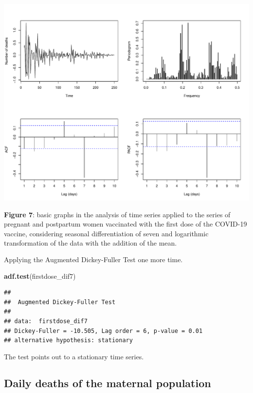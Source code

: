 \documentclass[
]{article}
\newenvironment{Shaded}{\begin{snugshade}}{\end{snugshade}}
\newcommand{\FunctionTok}[1]{\textcolor[rgb]{0.13,0.29,0.53}{\textbf{#1}}}
\newcommand{\NormalTok}[1]{#1}
\renewenvironment{Shaded}{\begin{mdframed}[ backgroundcolor=shadecolor, linecolor = shadecolor, leftmargin=\dimexpr\leftmargin-2pt\relax, innerleftmargin=1.6pt, innertopmargin=5pt, skipabove=10pt,skipbelow=3pt ]}{\end{mdframed}}
\begin{document}
\begin{center}\includegraphics[width=\linewidth]{IF_results_ENG_files/figure-latex/unnamed-chunk-8-1} \end{center}

\textbf{Figure 7}: basic graphs in the analysis of time series applied
to the series of pregnant and postpartum women vaccinated with the first
dose of the COVID-19 vaccine, considering seasonal differentiation of
seven and logarithmic transformation of the data with the addition of
the mean.

Applying the Augmented Dickey-Fuller Test one more time.

\begin{Shaded}
\begin{Highlighting}[]
\FunctionTok{adf.test}\NormalTok{(firstdose\_dif7)}
\end{Highlighting}
\end{Shaded}

\begin{verbatim}
## 
##  Augmented Dickey-Fuller Test
## 
## data:  firstdose_dif7
## Dickey-Fuller = -10.505, Lag order = 6, p-value = 0.01
## alternative hypothesis: stationary
\end{verbatim}

The test points out to a stationary time series.

\subsection{Daily deaths of the maternal
population}\label{daily-deaths-of-the-maternal-population}
\end{document}

